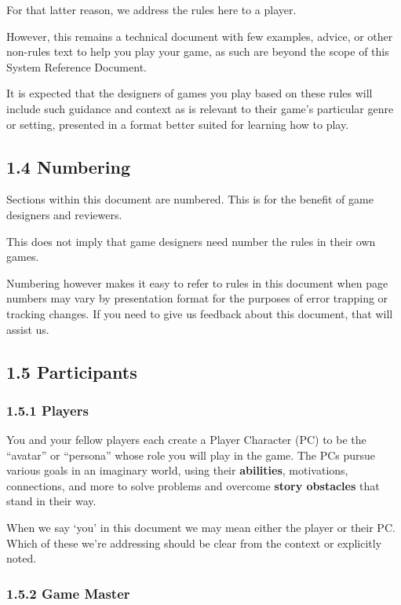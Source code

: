 \documentclass[
  11pt,
]{article}
\begin{document}
For that latter reason, we address the rules here to a player.

However, this remains a technical document with few examples, advice, or
other non-rules text to help you play your game, as such are beyond the
scope of this System Reference Document.

It is expected that the designers of games you play based on these rules
will include such guidance and context as is relevant to their game's
particular genre or setting, presented in a format better suited for
learning how to play.

\hypertarget{numbering}{%
\subsection{1.4 Numbering}\label{numbering}}

Sections within this document are numbered. This is for the benefit of
game designers and reviewers.

This does not imply that game designers need number the rules in their
own games.

Numbering however makes it easy to refer to rules in this document when
page numbers may vary by presentation format for the purposes of error
trapping or tracking changes. If you need to give us feedback about this
document, that will assist us.

\hypertarget{participants}{%
\subsection{1.5 Participants}\label{participants}}

\hypertarget{players}{%
\subsubsection{1.5.1 Players}\label{players}}

You and your fellow players each create a Player Character (PC) to be
the ``avatar'' or ``persona'' whose role you will play in the game. The
PCs pursue various goals in an imaginary world, using their
\textbf{abilities}, motivations, connections, and more to solve problems
and overcome \textbf{story obstacles} that stand in their way.

When we say `you' in this document we may mean either the player or
their PC. Which of these we're addressing should be clear from the
context or explicitly noted.

\hypertarget{game-master}{%
\subsubsection{1.5.2 Game Master}\label{game-master}}
\end{document}
